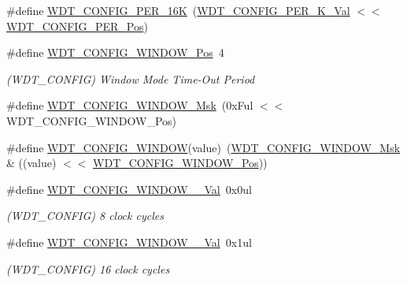 \begin{DoxyCompactItemize}
\item 
\#define \mbox{\hyperlink{group___s_a_m_d21___w_d_t_ga067b7d43db99d2cc49fa28f767b250ee}{W\+D\+T\+\_\+\+C\+O\+N\+F\+I\+G\+\_\+\+P\+E\+R\+\_\+16K}}~(\mbox{\hyperlink{group___s_a_m_d21___w_d_t_ga3a4ddeafbe076f5d3219286366c73cae}{W\+D\+T\+\_\+\+C\+O\+N\+F\+I\+G\+\_\+\+P\+E\+R\+\_\+K\+\_\+\+Val}}        $<$$<$ \mbox{\hyperlink{group___s_a_m_d21___w_d_t_ga55662a2fa7e16fd6cc7a5e0800034360}{W\+D\+T\+\_\+\+C\+O\+N\+F\+I\+G\+\_\+\+P\+E\+R\+\_\+\+Pos}})
\item 
\#define \mbox{\hyperlink{group___s_a_m_d21___w_d_t_gab2d3263bd9ad06e3257234d9da623ef8}{W\+D\+T\+\_\+\+C\+O\+N\+F\+I\+G\+\_\+\+W\+I\+N\+D\+O\+W\+\_\+\+Pos}}~4
\begin{DoxyCompactList}\small\item\em (W\+D\+T\+\_\+\+C\+O\+N\+F\+IG) Window Mode Time-\/\+Out Period \end{DoxyCompactList}\item 
\#define \mbox{\hyperlink{group___s_a_m_d21___w_d_t_gadbf0e2faa64af4cac57e1279414aa8ad}{W\+D\+T\+\_\+\+C\+O\+N\+F\+I\+G\+\_\+\+W\+I\+N\+D\+O\+W\+\_\+\+Msk}}~(0x\+Ful $<$$<$ W\+D\+T\+\_\+\+C\+O\+N\+F\+I\+G\+\_\+\+W\+I\+N\+D\+O\+W\+\_\+\+Pos)
\item 
\#define \mbox{\hyperlink{group___s_a_m_d21___w_d_t_gacfafc7c7ce1a04a46d9b972c667a4706}{W\+D\+T\+\_\+\+C\+O\+N\+F\+I\+G\+\_\+\+W\+I\+N\+D\+OW}}(value)~(\mbox{\hyperlink{group___s_a_m_d21___w_d_t_gadbf0e2faa64af4cac57e1279414aa8ad}{W\+D\+T\+\_\+\+C\+O\+N\+F\+I\+G\+\_\+\+W\+I\+N\+D\+O\+W\+\_\+\+Msk}} \& ((value) $<$$<$ \mbox{\hyperlink{group___s_a_m_d21___w_d_t_gab2d3263bd9ad06e3257234d9da623ef8}{W\+D\+T\+\_\+\+C\+O\+N\+F\+I\+G\+\_\+\+W\+I\+N\+D\+O\+W\+\_\+\+Pos}}))
\item 
\#define \mbox{\hyperlink{group___s_a_m_d21___w_d_t_ga6da4155b3fd5c2b0ca611e77e6d201b2}{W\+D\+T\+\_\+\+C\+O\+N\+F\+I\+G\+\_\+\+W\+I\+N\+D\+O\+W\+\_\+\_\+\+Val}}~0x0ul
\begin{DoxyCompactList}\small\item\em (W\+D\+T\+\_\+\+C\+O\+N\+F\+IG) 8 clock cycles \end{DoxyCompactList}\item 
\#define \mbox{\hyperlink{group___s_a_m_d21___w_d_t_ga94c78bd81746a104a1b22a87fce13031}{W\+D\+T\+\_\+\+C\+O\+N\+F\+I\+G\+\_\+\+W\+I\+N\+D\+O\+W\+\_\+\_\+\+Val}}~0x1ul
\begin{DoxyCompactList}\small\item\em (W\+D\+T\+\_\+\+C\+O\+N\+F\+IG) 16 clock cycles \end{DoxyCompactList}\item 
$$
\end{DoxyCompactItemize}
